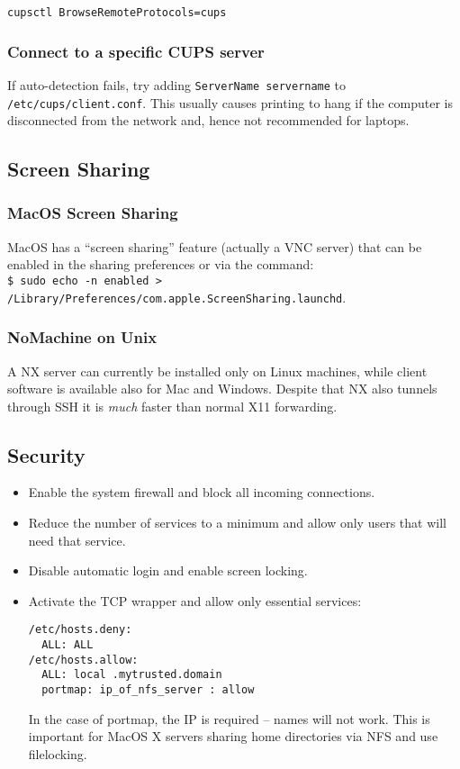 \documentclass[a4paper,10pt]{article}
\begin{document}
\verb+cupsctl BrowseRemoteProtocols=cups+

\subsubsection{Connect to a specific CUPS server}
If auto-detection fails, try adding \verb"ServerName servername" to \verb"/etc/cups/client.conf". This usually causes printing to hang if the computer is disconnected from the network and, hence not recommended for laptops.

\subsection{Screen Sharing}
\subsubsection{MacOS Screen Sharing}
MacOS has a ``screen sharing'' feature (actually a VNC server) that can be enabled in the sharing preferences or via the command:\\

\verb+$ sudo echo -n enabled > /Library/Preferences/com.apple.ScreenSharing.launchd+.

\subsubsection{NoMachine on Unix}
A NX server can currently be installed only on Linux machines, while client software is available
also for Mac and Windows. Despite that NX also tunnels through SSH it is \emph{much} faster than normal X11 forwarding.

\subsection{Security}
\begin{itemize}
\item Enable the system firewall and block all incoming connections.
\item Reduce the number of services to a minimum and allow only users that will need that service.
\item Disable automatic login and enable screen locking.
\item Activate the TCP wrapper and allow only essential services:
\begin{verbatim}
/etc/hosts.deny:
  ALL: ALL
/etc/hosts.allow:
  ALL: local .mytrusted.domain
  portmap: ip_of_nfs_server : allow
\end{verbatim}
In the case of portmap, the IP is required -- names will not work. This is important for MacOS X servers sharing home directories via NFS and use filelocking.
\end{itemize}
\end{document}
